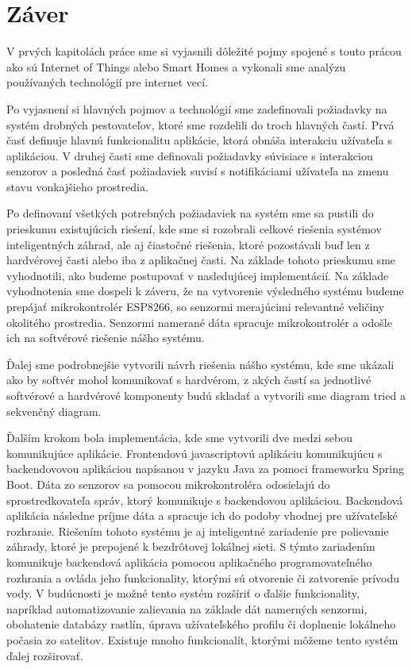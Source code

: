 \documentclass[twoside]{ctuthesis}
\theoremstyle{plain}
\theoremstyle{definition}
\theoremstyle{note}
\begin{document}
\chapter{Záver}
V prvých kapitolách práce sme si vyjasnili dôležité pojmy spojené s touto prácou ako sú Internet of Things alebo Smart Homes a vykonali sme analýzu používaných technológií pre internet vecí.

Po vyjasnení si hlavných pojmov a technológií sme zadefinovali požiadavky na systém drobných pestovateľov, ktoré sme rozdelili do troch hlavných častí. Prvá časť definuje hlavnú funkcionalitu aplikácie, ktorá obnáša interakciu užívateľa s aplikáciou. V druhej časti sme definovali požiadavky súvisiace s interakciou senzorov a posledná časť požiadaviek suvisí s notifikáciami užívateľa na zmenu stavu vonkajšieho prostredia.

Po definovaní všetkých potrebných požiadaviek na systém sme sa pustili do prieskumu existujúcich riešení, kde sme si rozobrali celkové riešenia systémov inteligentných záhrad, ale aj čiastočné riešenia, ktoré pozostávali buď len z hardvérovej časti alebo iba z aplikačnej časti. Na základe tohoto prieskumu sme vyhodnotili, ako budeme postupovať v nasledujúcej implementácií. Na základe vyhodnotenia sme dospeli k záveru, že na vytvorenie výsledného systému budeme prepájať mikrokontrolér ESP8266, so senzormi merajúcimi relevantné veličiny okolitého prostredia. Senzormi namerané dáta spracuje mikrokontrolér a odošle ich na softvérové riešenie nášho systému.

 Ďalej sme podrobnejšie vytvorili návrh riešenia nášho systému, kde sme ukázali ako by softvér mohol komunikovať s hardvérom, z akých častí sa jednotlivé softvérové a hardvérové komponenty budú skladať a vytvorili sme diagram tried a sekvenčný diagram. 
 
 Ďalším krokom bola implementácia, kde sme vytvorili dve medzi sebou komunikujúce aplikácie. Frontendovú javascriptovú aplikáciu komunikujúcu s backendovovou aplikáciou napísanou v jazyku Java za pomoci frameworku Spring Boot. Dáta zo senzorov sa pomocou mikrokontroléra odosielajú do sprostredkovateľa správ, ktorý komunikuje s backendovou aplikáciou. Backendová aplikácia následne príjme dáta a spracuje ich do podoby vhodnej pre užívateľské rozhranie. Riešením tohoto systému je aj inteligentné zariadenie pre polievanie záhrady, ktoré je prepojené k bezdrôtovej lokálnej sieti. S týmto zariadením komunikuje backendová aplikácia pomocou aplikačného programovateľného rozhrania a ovláda jeho funkcionality, ktorými sú otvorenie či zatvorenie prívodu vody. 
\newpage
V budúcnosti je možné tento systém rozšíriť o ďalšie funkcionality, napríklad automatizovanie zalievania na základe dát namerných senzormi, obohatenie databázy rastlín, úprava užívateľského profilu či doplnenie lokálneho počasia zo satelitov. Existuje mnoho funkcionalít, ktorými môžeme tento systém ďalej rozširovať.
\end{document}
